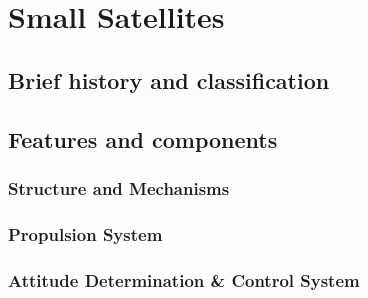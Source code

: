 %
%
%


\chapter{Small Satellites}
\label{chp:SmallSat}

\section{Brief history and classification}
\label{sec:SmallSat_HistoryClass}

\lipsum


\section{Features and components}
\label{sec:SmallSat_FeaturesComponents}

\lipsum

\subsection{Structure and Mechanisms}
\label{subsec:Structures}

\lipsum

\subsection{Propulsion System}
\label{subsec:Propulsion}

\lipsum

\subsection{Attitude Determination \& Control System}
\label{subsec:ADCS}

\lipsum

